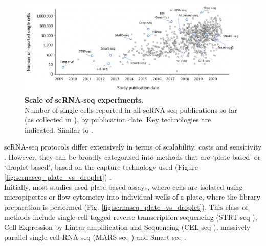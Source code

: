 \begin{figure}[h]
\centering
\includegraphics[width=16cm]{Chapter3/Fig/scrnaseq_ncells.png}
\caption[scRNA-seq technologies]{\textbf{Scale of scRNA-seq experiments}.\\
Number of single cells reported in all scRNA-seq publications so far (as collected in \cite{svensson2020single}), by publication date.
Key technologies are indicated.
Similar to \cite{svensson2018exponential}.}
\label{fig:scrnaseq_technologies}
\end{figure}

scRNA-seq protocols differ extensively in terms of scalability, costs and sensitivity 
\cite{ziegenhain2017comparative, svensson2018exponential}.
However, they can be broadly categorised into methods that are 
`plate-based' or `droplet-based', based on the capture technology used
(Figure \ref{fig:scrnaseq_plate_vs_droplet})
.\\

Initially, most studies used plate-based assays, where cells are isolated using micropipettes or flow cytometry into individual wells of a plate, where the library preparation is performed (Fig. \ref{fig:scrnaseq_plate_vs_droplet}).
This class of methods include single-cell tagged reverse transcription sequencing (STRT-seq \cite{islam2011characterization}), Cell Expression by Linear amplification and Sequencing (CEL-seq \cite{hashimshony2012cel}), massively parallel single cell RNA-seq (MARS-seq \cite{jaitin2014massively}) and Smart-seq \cite{ramskold2012full, picelli2013smart, hagemann2020single}. 
\\

